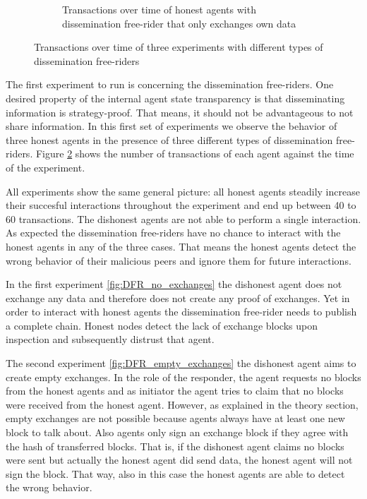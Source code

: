 \begin{figure}
\begin{subfigure}{\textwidth}
        \caption{Transactions over time of honest agents with dissemination free-rider that only 
        exchanges own data}
        \label{fig:DFR_self_request}
      \end{subfigure}
    \caption{Transactions over time of three experiments with different types of dissemination 
    free-riders}
    \label{fig:DFR}
\end{figure}

The first experiment to run is concerning the dissemination free-riders. One desired property of the 
internal agent state transparency is that disseminating information is strategy-proof. That means, 
it should not be advantageous to not share information. In this first set of experiments we observe
the behavior of three honest agents in the presence of three different types of dissemination 
free-riders. Figure \ref{fig:DFR} shows the number of transactions of each agent against the time of
the experiment.

All experiments show the same general picture: all honest agents steadily increase their succesful 
interactions throughout the experiment and end up between 40 to 60 transactions. The dishonest agents 
are not able to perform a single interaction. As expected 
the dissemination free-riders have no chance to interact with the honest agents in any 
of the three cases. That means the honest agents detect the wrong behavior of their malicious peers
and ignore them for future interactions.

In the first experiment \ref{fig:DFR_no_exchanges} the 
dishonest agent does not exchange any data and therefore does not create any proof of exchanges. Yet
in order to interact with honest agents the dissemination free-rider needs to publish a complete 
chain. Honest nodes detect the lack of exchange blocks upon inspection and subsequently distrust 
that agent.

The second experiment \ref{fig:DFR_empty_exchanges} the dishonest agent aims to create empty exchanges.
In the role of the responder, the agent requests no blocks from the honest agents and as initiator 
the agent tries to claim that no blocks were received from the honest agent. However, as explained
in the theory section, empty exchanges are not possible because agents always have at least one new
block to talk about. Also agents only sign an exchange block if they agree with the hash of transferred
blocks. That is, if the dishonest agent claims no blocks were sent but actually the honest agent did
send data, the honest agent will not sign the block. That way, also in this case the honest agents
are able to detect the wrong behavior.


